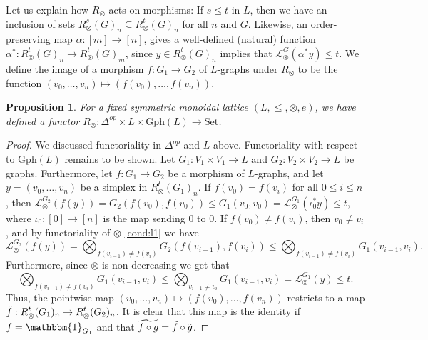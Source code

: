 \documentclass[a4paper,11pt]{article}
\newcommand{\Set}{\mathrm{Set}}
\newcommand{\Gph}{\mathrm{Gph}}
\newcommand{\Id}{\mathbbm{1}}
\newcommand{\tensor}{\otimes}
\newcommand{\bigtensor}{\bigotimes}
\newcounter{dummy}\numberwithin{dummy}{section}
\newtheorem{proposition}[dummy]{Proposition}
\theoremstyle{remark}
\begin{document}
Let us explain how $R_\tensor$ acts on morphisms: If $s\leq t$ in $L$, then we have an inclusion of sets $R^s_\tensor(G)_n\subseteq R^t_\tensor(G)_n$ for all $n$ and $G$. Likewise, an order-preserving map $\alpha\colon [m]\to[n]$, gives a well-defined (natural) function $\alpha^*\colon R^t_\tensor(G)_n\to R^t_\tensor(G)_m$, since $y\in R^t_\tensor(G)_n$ implies that $\mathcal{L}_\tensor^G(\alpha^*y)\leq t$. We define the image of a morphism $f\colon G_1\to G_2$ of $L$-graphs under $R_\tensor$ to be the function $(v_0,\ldots, v_n)\mapsto (f(v_0), \ldots, f(v_n))$.

\begin{proposition}\label{prop:R_tensor_is_a_functor}
For a fixed symmetric monoidal lattice $(L, \leq, \tensor, e)$, we have defined a functor $R_\tensor\colon \Delta^{op}\times L\times \Gph(L)\to \Set$.
\end{proposition}
\begin{proof}
    We discussed functoriality in $\Delta^{op}$ and $L$  above. Functoriality with respect to $\Gph(L)$ remains to be shown. Let $G_1\colon V_1\times V_1\to L$ and $G_2\colon V_2\times V_2\to L$ be graphs. Furthermore, let $f\colon G_1\to G_2$ be a morphism of $L$-graphs, and let $y=(v_0,\dots,v_n)$ be a simplex in $R^t_\tensor(G_1)_n$. If $f(v_0)= f(v_i)$ for all $0\leq i\leq n$, then 
    $
    \mathcal{L}^{G_2}_\tensor(f(y))=G_2(f(v_0),f(v_0))\leq G_1(v_0,v_0)= \mathcal{L}^{G_1}_\tensor(\iota_0^*y)\leq t,
    $
    where $\iota_0\colon [0]\to[n]$ is the map sending $0$ to $0$. If $f(v_0)\neq f(v_i)$, then $v_0\neq v_i$, and by functoriality of $\tensor$ \ref{cond:l1} we have
    \begin{equation*}
        \mathcal{L}^{G_2}_\tensor(f(y))=\bigtensor_{f(v_{i-1})\neq f(v_{i})}G_2(f(v_{i-1}),f(v_{i})) \leq \bigtensor_{f(v_{i-1})\neq f(v_{i})}G_1(v_{i-1},v_{i}).
    \end{equation*}
    Furthermore, since $\tensor$ is non-decreasing we get that
    \begin{equation*}
        \bigtensor_{f(v_{i-1})\neq f(v_{i})}G_1(v_{i-1},v_{i})\leq \bigtensor_{v_{i-1}\neq v_{i}}G_1(v_{i-1},v_{i})=\mathcal{L}^{G_1}_\tensor(y)\leq t.
    \end{equation*}
    Thus, the pointwise map $(v_0,\ldots, v_n)\mapsto (f(v_0), \ldots, f(v_n))$ restricts to a map $\Tilde{f}:R^t_\tensor(G_1)_n\to R^t_\tensor(G_2)_n$. It is clear that this map is the identity if $f=\Id_{G_1}$ and that $\widetilde{f\circ g}=\Tilde{f}\circ \Tilde{g}$.
\end{proof}
\end{document}
